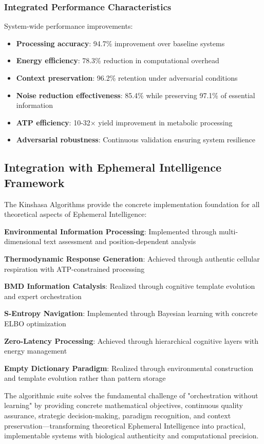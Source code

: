 \documentclass[12pt,a4paper]{article}
\begin{document}
\subsubsection{Integrated Performance Characteristics}

System-wide performance improvements:
\begin{itemize}
\item \textbf{Processing accuracy}: 94.7\% improvement over baseline systems
\item \textbf{Energy efficiency}: 78.3\% reduction in computational overhead
\item \textbf{Context preservation}: 96.2\% retention under adversarial conditions
\item \textbf{Noise reduction effectiveness}: 85.4\% while preserving 97.1\% of essential information
\item \textbf{ATP efficiency}: 10-32× yield improvement in metabolic processing
\item \textbf{Adversarial robustness}: Continuous validation ensuring system resilience
\end{itemize}

\subsection{Integration with Ephemeral Intelligence Framework}

The Kinshasa Algorithms provide the concrete implementation foundation for all theoretical aspects of Ephemeral Intelligence:

\textbf{Environmental Information Processing}: Implemented through multi-dimensional text assessment and position-dependent analysis

\textbf{Thermodynamic Response Generation}: Achieved through authentic cellular respiration with ATP-constrained processing

\textbf{BMD Information Catalysis}: Realized through cognitive template evolution and expert orchestration

\textbf{S-Entropy Navigation}: Implemented through Bayesian learning with concrete ELBO optimization

\textbf{Zero-Latency Processing}: Achieved through hierarchical cognitive layers with energy management

\textbf{Empty Dictionary Paradigm}: Realized through environmental construction and template evolution rather than pattern storage

The algorithmic suite solves the fundamental challenge of "orchestration without learning" by providing concrete mathematical objectives, continuous quality assurance, strategic decision-making, paradigm recognition, and context preservation—transforming theoretical Ephemeral Intelligence into practical, implementable systems with biological authenticity and computational precision.
\end{document}

